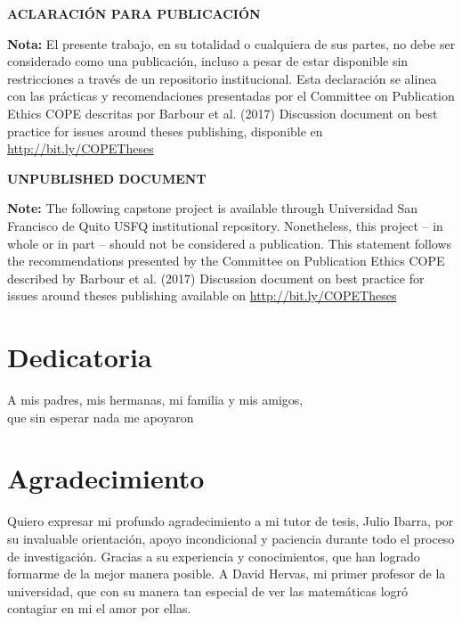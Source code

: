 \documentclass[a4paper, 12pt]{report}
\begin{document}
\newpage
\begin{center}
\begin{LARGE}
\textbf{ACLARACIÓN PARA PUBLICACIÓN}
\end{LARGE}
\end{center}


\noindent
\normalsize\textbf{Nota:} El presente trabajo, en su totalidad o cualquiera de sus partes, no debe ser considerado como una publicación, incluso a pesar de estar disponible sin restricciones a través de un repositorio institucional. Esta declaración se alinea con las prácticas y recomendaciones presentadas por el Committee on Publication Ethics COPE descritas por Barbour et al. (2017) Discussion document on best practice for issues around theses publishing, disponible en \url{http://bit.ly/COPETheses}

\setlength{\parskip}{10mm}
\begin{center}
\begin{LARGE}
\textbf{UNPUBLISHED DOCUMENT}
\end{LARGE}
\end{center}


\noindent
\normalsize\textbf{Note:} The following capstone project is available through Universidad San Francisco de Quito USFQ institutional repository. Nonetheless, this project – in whole or in part – should not be considered a publication. This statement follows the recommendations presented by the Committee on Publication Ethics COPE described by Barbour et al. (2017) Discussion document on best practice for issues around theses publishing available on \url{http://bit.ly/COPETheses}




\chapter*{Dedicatoria}
\begin{flushright}
  \Large A mis padres, mis hermanas, mi familia y mis amigos, \\
  que sin esperar nada me apoyaron
\end{flushright}


\chapter*{Agradecimiento}

Quiero expresar mi profundo agradecimiento a mi tutor de tesis,
Julio Ibarra, por su invaluable orientación, apoyo incondicional y
paciencia durante todo el proceso de investigación. Gracias a su experiencia y
conocimientos, que han logrado formarme de la mejor manera posible. 
A David Hervas, mi primer profesor de la universidad, que
con su manera tan especial de ver las matemáticas logró contagiar en mi el amor
por ellas.
\end{document}
